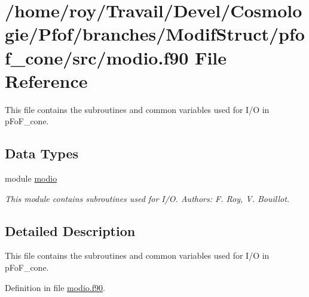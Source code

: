 \hypertarget{pfof__cone_2src_2modio_8f90}{\section{/home/roy/\-Travail/\-Devel/\-Cosmologie/\-Pfof/branches/\-Modif\-Struct/pfof\-\_\-cone/src/modio.f90 File Reference}
\label{pfof__cone_2src_2modio_8f90}
}


This file contains the subroutines and common variables used for I/\-O in p\-Fo\-F\-\_\-cone.  


\subsection*{Data Types}
\begin{DoxyCompactItemize}
\item 
module \hyperlink{classmodio}{modio}
\begin{DoxyCompactList}\small\item\em This module contains subroutines used for I/\-O. Authors\-: F. Roy, V. Bouillot. \end{DoxyCompactList}\end{DoxyCompactItemize}


\subsection{Detailed Description}
This file contains the subroutines and common variables used for I/\-O in p\-Fo\-F\-\_\-cone. 

Definition in file \hyperlink{pfof__cone_2src_2modio_8f90_source}{modio.\-f90}.

